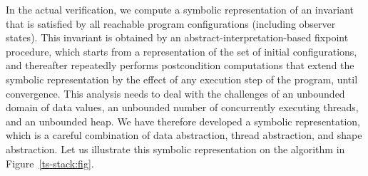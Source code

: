 
In the actual verification, we compute a symbolic representation
of an invariant that is satisfied by all reachable program configurations (including observer states).
This invariant is obtained by an abstract-interpretation-based
fixpoint procedure, which starts
from a representation of the set of initial configurations, and
thereafter repeatedly performs
postcondition computations that extend the
symbolic representation by the effect of any execution step of the program,
until convergence.
This analysis needs to deal with the challenges of an unbounded domain of
data values, an unbounded number of concurrently executing threads, and an
unbounded heap. We have therefore developed a symbolic representation, which
is a careful combination of
data abstraction, thread abstraction, and shape abstraction. 
Let us illustrate this symbolic representation on the algorithm in
Figure~\ref{ts-stack:fig}.

